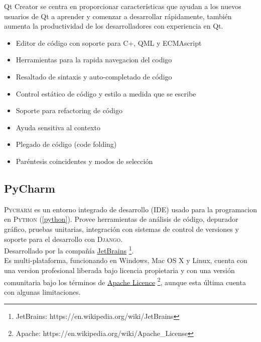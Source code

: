 \documentclass[12pt]{book} %
\begin{document}
	Qt Creator se centra en proporcionar características que ayudan a los nuevos usuarios de Qt a aprender y comenzar a desarrollar
	rápidamente, también aumenta la productividad de los desarrolladores con experiencia en Qt.
	\begin{multicols}{2}
	\begin{itemize}
		\item Editor de código con soporte para C+, QML y ECMAscript
		\item Herramientas para la rapida navegacion del codigo
    	\item Resaltado de sintaxis y auto-completado de código
		\item Control estático de código y estilo a medida que se escribe
	    \item Soporte para refactoring de código
    	\item Ayuda sensitiva al contexto
	    \item Plegado de código (code folding)
    	\item Paréntesis coincidentes y modos de selección
	\end{itemize}
	\end{multicols}
	
	\subsection{PyCharm \label{pych}}
		\textsc{Pycharm} es un entorno integrado de desarrollo (\textsc{IDE}) usado para la programacion en \textsc{Python} (\ref{python}). 
		Provee herramientas de análisis de código, depurador gráfico, pruebas unitarias, integración con sistemas de control de versiones
		y soporte para el desarrollo con \textsc{Django}.\\
		Desarrollado por la compañía \href{https://en.wikipedia.org/wiki/JetBrains}{JetBrains}
		\footnote{\scriptsize JetBrains: https://en.wikipedia.org/wiki/JetBrains}.\\
		
		Es multi-plataforma, funcionando en Windows, Mac OS X y Linux, cuenta con una version profesional liberada bajo licencia 
		propietaria y con una versión comunitaria bajo los términos de \href {https://en.wikipedia.org/wiki/Apache_License}{Apache Licence}
		\footnote{\scriptsize Apache: https://en.wikipedia.org/wiki/Apache\_License}, aunque esta última cuenta con algunas limitaciones.\\
		
\end{document}
